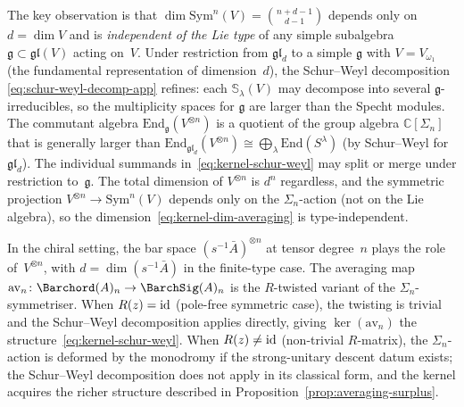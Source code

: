 \begin{remark}
The key observation is that
$\dim\mathrm{Sym}^n(V) = \binom{n + d - 1}{d - 1}$
depends only on $d = \dim V$ and is \emph{independent of the Lie type}
of any simple subalgebra $\mathfrak{g} \subset \mathfrak{gl}(V)$
acting on~$V$. Under restriction from $\mathfrak{gl}_d$ to a simple
$\mathfrak{g}$ with $V = V_{\omega_1}$ (the fundamental representation
of dimension~$d$), the Schur--Weyl decomposition
\eqref{eq:schur-weyl-decomp-app} refines: each $\mathbb{S}_\lambda(V)$
may decompose into several $\mathfrak{g}$-irreducibles, so the
multiplicity spaces for $\mathfrak{g}$ are larger than the Specht
modules. The commutant algebra
$\mathrm{End}_{\mathfrak{g}}(V^{\otimes n})$ is a quotient of the
group algebra $\mathbb{C}[\Sigma_n]$ that is generally larger than
$\mathrm{End}_{\mathfrak{gl}_d}(V^{\otimes n}) \cong
\bigoplus_\lambda \mathrm{End}(S^\lambda)$
(by Schur--Weyl for $\mathfrak{gl}_d$). The individual summands
in~\eqref{eq:kernel-schur-weyl} may split or merge under restriction
to~$\mathfrak{g}$. The total dimension of $V^{\otimes n}$ is
$d^n$ regardless, and the symmetric projection
$V^{\otimes n} \to \mathrm{Sym}^n(V)$ depends only on the
$\Sigma_n$-action (not on the Lie algebra), so the
dimension~\eqref{eq:kernel-dim-averaging} is type-independent.

In the chiral setting, the bar space
$(s^{-1}\bar{A})^{\otimes n}$ at tensor degree~$n$ plays the role
of~$V^{\otimes n}$, with $d = \dim(s^{-1}\bar{A})$ in the
finite-type case. The averaging map
$\mathrm{av}_n\colon \Barchord(A)_n \to \BarchSig(A)_n$
is the $R$-twisted variant of the $\Sigma_n$-symmetriser. When
$R(z)=\mathrm{id}$ (pole-free symmetric case), the twisting is trivial and the
Schur--Weyl decomposition applies directly, giving
$\ker(\mathrm{av}_n)$ the structure~\eqref{eq:kernel-schur-weyl}.
When $R(z)\neq\mathrm{id}$ (non-trivial $R$-matrix), the $\Sigma_n$-action
is deformed by the monodromy if the strong-unitary descent datum
exists; the Schur--Weyl decomposition does not apply in its classical
form, and the kernel acquires the richer structure described in
Proposition~\ref{prop:averaging-surplus}.
\end{remark}

